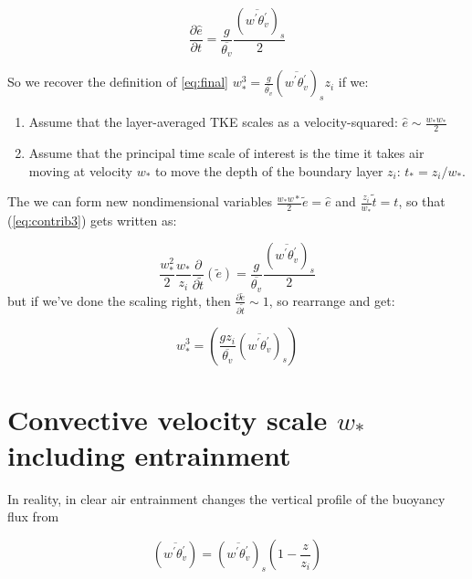 \documentclass[12pt]{article}
\begin{document}
\begin{enumerate}
\begin{equation}
  \label{eq:contrib3}
  \frac{ \partial  \hat{e}}{ \partial t}   = \frac{ g }{\overline{\theta_v}} 
\frac{  \left (\overline{ w^\prime \theta_v^\prime } \right )_s }{2}
\end{equation}

So we recover the definition of \eqref{eq:final} $w^3_* = \frac{ g }{\overline{\theta_v}} \left (\overline{ w^\prime \theta_v^\prime } \right )_s z_i$ 
if we:

\begin{enumerate}
\item Assume that the layer-averaged TKE scales as a velocity-squared:  $\hat{e} \sim \frac{w_* w_* }{2}$
\item Assume that the principal time scale of interest is the time it takes air moving at velocity $w_*$ to move the
depth of the boundary layer $z_i$:  $t_* = z_i/w_*$.
\end{enumerate}

The we can form new nondimensional variables $\frac{w_* w*} {2} \widetilde{e}=  \hat{e} $ and
$\frac{z_i }{w_*} \widetilde{t} = t$, so that (\ref{eq:contrib3}) gets written as:

\begin{equation}
  \label{eq:contrib4}
\frac{ w_*^2}{2} \frac{w_* }{z_i}  \frac{ \partial }{ \partial \widetilde{t}} \left (\widetilde{e}  \right ) = 
\frac{ g }{\overline{\theta_v}} 
\frac{  \left (\overline{ w^\prime \theta_v^\prime } \right )_s }{2} 
\end{equation}
but if we've done the scaling right, then $\frac{\partial \widetilde{e} }{ \partial \widetilde{t}} \sim 1$, so rearrange
and get:


\begin{equation}
  \label{eq:final}
    w_*^3 = \left (  \frac{ g z_i}{\overline{ \theta_v}} \left (  \overline{ w^\prime \theta_v^\prime } \right )_s \right )
\end{equation}


\end{enumerate}

\section{Convective velocity scale $w_*$ including entrainment}


In reality, in clear air entrainment changes the vertical profile of the buoyancy flux from

\begin{equation}
  \label{eq:linear2}
 \left (\overline{ w^\prime \theta_v^\prime } \right ) =  \left (\overline{ w^\prime \theta_v^\prime } \right )_s  \left (    1 - \frac{ z}{z_i}  \right )
\end{equation}
\end{document}
